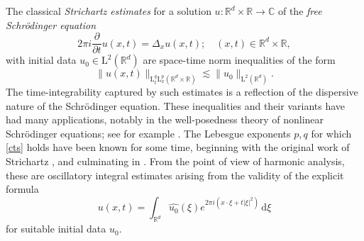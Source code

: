\documentclass[10pt,a4paper]{amsart}
\numberwithin{equation}{section}
\newcommand{\dd}{\,\mathrm{d}}
\begin{document}
The classical \emph{Strichartz estimates} for a solution $u\colon\mathbb{R}^d\times\mathbb{R}\rightarrow\mathbb{C}$ of the \emph{free Schr\"{o}dinger equation}
\begin{equation*}%
2\pi i\frac{\partial}{\partial t} u(x,t) = \Delta_x u(x,t); \quad (x,t)\in\mathbb{R}^d\times \mathbb{R},
\end{equation*}
with initial data $u_0\in \mathrm{L}^2(\mathbb{R}^d)$ are space-time norm inequalities of the form
\begin{equation}\label{cts}
\|u(x,t)\|_{\mathrm{L}^q_t\mathrm{L}^p_x(\mathbb{R}^d\times\mathbb{R})}\lesssim\|u_0\|_{\mathrm{L}^2(\mathbb{R}^d)}.
\end{equation}
The time-integrability captured by such estimates is a reflection of the dispersive nature of the Schr\"{o}dinger equation. These inequalities and their variants have had many applications, notably in the well-posedness theory of nonlinear Schr\"{o}dinger equations; see for example \cite{TaoDisp}. 
The Lebesgue exponents $p,q$ for which \eqref{cts} holds have been known for some time, beginning with the original work of Strichartz \cite{Stric}, and culminating in \cite{KT}. From the point of view of harmonic analysis, these are oscillatory integral estimates arising from the validity of the explicit formula
\begin{equation}\label{eq:Eucl-solution} 
u(x,t)=\int_{\mathbb{R}^d}\widehat{u_0}(\xi) e^{2\pi i(x\cdot \xi+t|\xi|^2)}\dd \xi
\end{equation}
for suitable initial data $u_0$.
\end{document}
